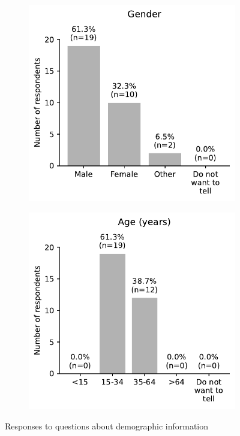 \begin{appendices}
\begin{figure}[H]
	\centering
	\begin{subfigure}[b]{0.5\textwidth}
		\centering
		\includegraphics[width=\textwidth]{visual/figures/survey/13.pdf}
	\end{subfigure}%
	\hfill
	\begin{subfigure}[b]{0.5\textwidth}
		\centering
		\includegraphics[width=\textwidth]{visual/figures/survey/14.pdf}
	\end{subfigure}%
	\caption{Responses to questions about demographic information}
	\label{fig:general questions}
\end{figure}

\end{appendices}
